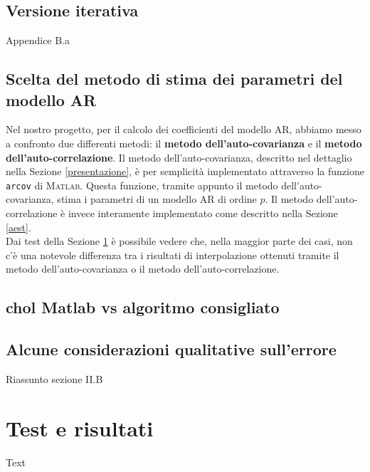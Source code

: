 \documentclass{article}
\begin{document}
	
	\subsection{Versione iterativa}
	Appendice B.a
	\subsection{Scelta del metodo di stima dei parametri del modello AR}
	Nel nostro progetto, per il calcolo dei coefficienti del modello AR, abbiamo messo a confronto due differenti metodi: il \textbf{metodo dell'auto-covarianza} e il \textbf{metodo dell'auto-correlazione}.
	Il metodo dell'auto-covarianza, descritto nel dettaglio nella Sezione \ref{presentazione}, è per semplicità implementato attraverso la funzione \texttt{arcov} di \textsc{Matlab}. Questa funzione, tramite appunto il metodo dell'auto-covarianza, stima i parametri di un modello AR di ordine $p$.
	Il metodo dell'auto-correlazione è invece interamente implementato come descritto nella Sezione \ref{aest}.
\\
	Dai test della Sezione \ref{test} è possibile vedere che, nella maggior parte dei casi, non c'è una notevole differenza tra i risultati di interpolazione ottenuti tramite il metodo dell'auto-covarianza o il metodo dell'auto-correlazione.
	
	\subsection{chol Matlab vs algoritmo consigliato}
	\subsection{Alcune considerazioni qualitative sull'errore}
	Riassunto sezione II.B

\newpage
	\section{Test e risultati} \label{test}
Text

\newpage

 

\end{document}
